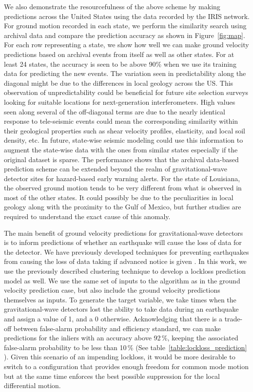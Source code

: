 \documentclass[twocolumn, aps, superscriptaddress]{revtex4}
\begin{document}
We also demonstrate the resourcefulness of the above scheme by making predictions across the United States using the data recorded by the IRIS network. For ground motion recorded in each state, we perform the similarity search using archival data  and compare the prediction accuracy as shown in Figure~\ref{fig:map}. For each row representing a state, we show how well we can make ground velocity predictions based on archival events from itself as well as other states. For at least 24 states, the accuracy is seen to be above 90\% when we use its training data for predicting the new events. The variation seen in predictability along the diagonal might be due to the differences in local geology across the US. This observation of unpredictability could be beneficial for future site selection surveys looking for suitable locations for next-generation interferometers. High values seen along several of the off-diagonal terms are due to the nearly identical response to tele-seismic events could mean the corresponding similarity within their geological properties such as shear velocity profiles, elasticity, and local soil density, etc. 
In future, state-wise seismic modeling could use this information to augment the state-wise data with the ones from similar states especially if the original dataset is sparse. The performance shows that the archival data-based prediction scheme can be extended beyond the realm of gravitational-wave detector sites for hazard-based early warning alerts. For the state of Louisiana, the observed ground motion tends to be very different from what is observed in most of the other states. It could possibly be due to the peculiarities in local geology along with the proximity to the Gulf of Mexico, but further studies are required to understand the exact cause of this anomaly. 

The main benefit of ground velocity predictions for gravitational-wave detectors is to inform predictions of whether an earthquake will cause the loss of data for the detector. We have previously developed techniques for preventing earthquakes from causing the loss of data taking if advanced notice is given \cite{BiWa2018}.
In this work, we  use the previously described clustering technique to develop a lockloss prediction model as well. 
We use the same set of inputs to the algorithm as in the ground velocity prediction case, but also include the ground velocity predictions themselves as inputs.
To generate the target variable, we take times when the gravitational-wave detectors lost the ability to take data during an earthquake and assign a value of 1, and a 0 otherwise. Acknowledging that there is a trade-off between false-alarm probability and efficiency standard, 
we can make predictions for the inliers with an accuracy above 92\,\%, keeping the associated false-alarm probability to be less than 10\,\% (See table~\ref{table:lockloss_prediction} ). Given this scenario of an impending lockloss, it would be more desirable to switch to a configuration that provides enough freedom for common mode motion but at the same time enforces the best possible suppression for the local differential motion. 
\end{document}
